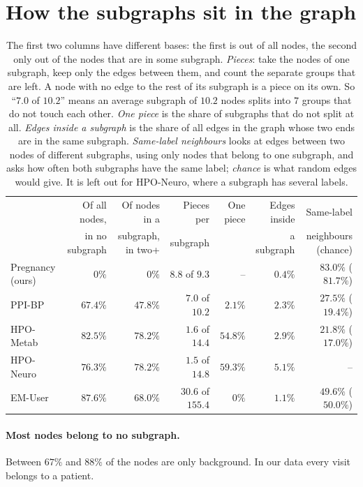 \documentclass[11pt]{article}
\begin{document}
\section*{How the subgraphs sit in the graph}

\begin{table}[H]
\centering
\small
\setlength{\tabcolsep}{3pt}
\begin{tabular}{lrrrrrr}
\toprule
 & Of all nodes, & Of nodes in a & Pieces per & One piece & Edges inside & Same-label \\
 & in no subgraph & subgraph, in two+ & subgraph & & a subgraph & neighbours (chance) \\
\midrule
Pregnancy (ours) & $0\%$ & $0\%$ & $8.8$ of $9.3$ & -- & $0.4\%$ & $83.0\%$ ($81.7\%$) \\
\addlinespace
PPI-BP & $67.4\%$ & $47.8\%$ & $7.0$ of $10.2$ & $2.1\%$ & $2.3\%$ & $27.5\%$ ($19.4\%$) \\
HPO-Metab & $82.5\%$ & $78.2\%$ & $1.6$ of $14.4$ & $54.8\%$ & $2.9\%$ & $21.8\%$ ($17.0\%$) \\
HPO-Neuro & $76.3\%$ & $78.2\%$ & $1.5$ of $14.8$ & $59.3\%$ & $5.1\%$ & -- \\
EM-User & $87.6\%$ & $68.0\%$ & $30.6$ of $155.4$ & $0\%$ & $1.1\%$ & $49.6\%$ ($50.0\%$) \\
\bottomrule
\end{tabular}
\caption{The first two columns have different bases: the first is out of all nodes, the
second only out of the nodes that are in some subgraph. \emph{Pieces}: take the nodes of one subgraph, keep only the edges between them, and count
the separate groups that are left. A node with no edge to the rest of its subgraph is a
piece on its own. So ``$7.0$ of $10.2$'' means an average subgraph of $10.2$ nodes splits
into $7$ groups that do not touch each other. \emph{One piece} is the share of subgraphs that
do not split at all. \emph{Edges inside a subgraph} is the share of all edges in the graph
whose two ends are in the same subgraph. \emph{Same-label neighbours} looks at edges between two nodes of different subgraphs,
using only nodes that belong to one subgraph, and asks how often both subgraphs have the same
label; \emph{chance} is what random edges would give. It is left out for HPO-Neuro, where a
subgraph has several labels.}
\end{table}

\paragraph{Most nodes belong to no subgraph.} Between $67\%$ and $88\%$ of the nodes are only
background. In our data every visit belongs to a patient.
\end{document}
